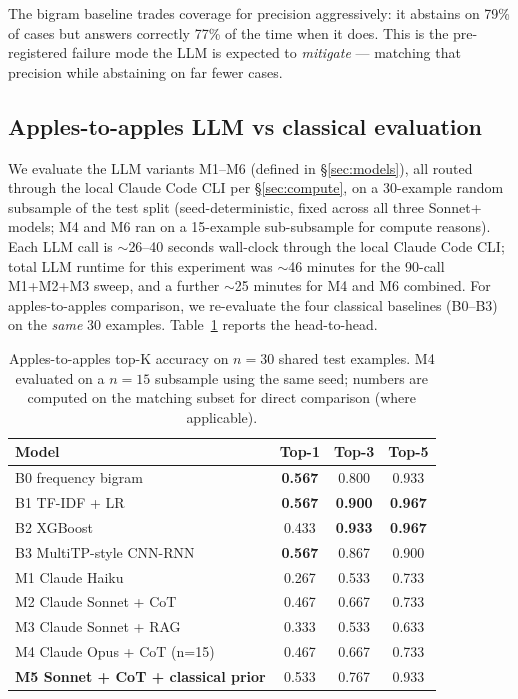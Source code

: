 \documentclass[preprint,authoryear,1p,12pt]{elsarticle}
\begin{document}
The bigram baseline trades coverage for precision aggressively: it abstains
on 79\% of cases but answers correctly 77\% of the time when it does. This
is the pre-registered failure mode the LLM is expected to {\em mitigate} ---
matching that precision while abstaining on far fewer cases.

\subsection{Apples-to-apples LLM vs classical evaluation}
\label{sec:llm-results}

We evaluate the LLM variants M1--M6 (defined in \S\ref{sec:models}),
all routed through the local Claude Code CLI per
\S\ref{sec:compute}, on a 30-example random subsample of the test split
(seed-deterministic, fixed across all three Sonnet+ models; M4 and M6
ran on a 15-example sub-subsample for compute reasons). Each LLM call is
\(\sim\)26--40 seconds wall-clock through the local Claude Code CLI; total
LLM runtime for this experiment was \(\sim\)46 minutes for the 90-call
M1+M2+M3 sweep, and a further \(\sim\)25 minutes for M4 and M6 combined.
For apples-to-apples comparison, we re-evaluate the four classical
baselines (B0--B3) on the \emph{same} 30 examples.
Table~\ref{tab:n30-headline} reports the head-to-head.

\begin{table}[h!]
\centering
\caption{Apples-to-apples top-K accuracy on $n{=}30$ shared test examples.
M4 evaluated on a $n{=}15$ subsample using the same seed; numbers are
computed on the matching subset for direct comparison (where applicable).}
\label{tab:n30-headline}
\begin{tabular}{lccc}
\toprule
Model & Top-1 & Top-3 & Top-5 \\
\midrule
B0 frequency bigram             & \textbf{0.567} & 0.800 & 0.933 \\
B1 TF-IDF + LR                  & \textbf{0.567} & \textbf{0.900} & \textbf{0.967} \\
B2 XGBoost                      & 0.433 & \textbf{0.933} & \textbf{0.967} \\
B3 MultiTP-style CNN-RNN        & \textbf{0.567} & 0.867 & 0.900 \\
\addlinespace
M1 Claude Haiku                 & 0.267 & 0.533 & 0.733 \\
M2 Claude Sonnet + CoT          & 0.467 & 0.667 & 0.733 \\
M3 Claude Sonnet + RAG          & 0.333 & 0.533 & 0.633 \\
M4 Claude Opus + CoT (n=15)     & 0.467 & 0.667 & 0.733 \\
\addlinespace
\textbf{M5 Sonnet + CoT + classical prior} & 0.533 & 0.767 & 0.933 \\
\bottomrule
\end{tabular}
\end{table}
\end{document}
